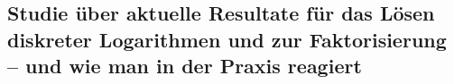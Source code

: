 \begin{refsegment}
\chapter%
{Studie über aktuelle Resultate für das Lösen diskreter Logarithmen und zur Faktorisierung -- und wie man in der Praxis reagiert}
%
%

\end{refsegment}
